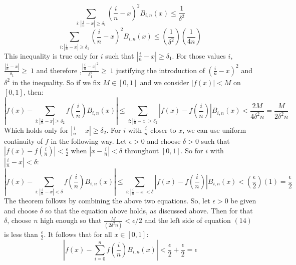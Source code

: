 \documentclass{article}
\begin{document}
\begin{equation}
\sum_{i:|\frac{i}{n}-x|\geq\delta_1}(\frac{i}{n}-x)^2B_{i,n}(x)\leq\frac{1}{\delta^2}
\end{equation}
\begin{equation}
\sum_{i:|\frac{i}{n}-x|\geq\delta_1}(\frac{i}{n}-x)^2B_{i,n}(x)\leq(\frac{1}{\delta^2})(\frac{1}{4n})
\end{equation}
This inequality is true only for $i$ such that $|\frac{i}{n}-x|\geq\delta_1$. For those values $i$, $\frac{|\frac{i}{n}-x|}{\delta_1}\geq\ 1$ and therefore ,$\frac{|\frac{i}{n}-x|^2}{\delta_1^2}\geq\ 1$ justifying the introduction of $(\frac{i}{n}-x)^2$ and $\delta^2$ in the inequality. So if we fix $M\in[0,1]$ and we consider $|f(x)|<M$ on $[0,1]$, then:
\begin{equation}
\left|f(x)-\sum_{i:|\frac{i}{n}-x|\geq\delta_2}f(\frac{i}{n})B_{i,n}(x)\right|\leq\sum_{i:|\frac{i}{n}-x|\geq\delta_2}\left|f(x)-f(\frac{i}{n})\right|B_{i,n}(x)<\frac{2M}{4\delta^2n}=\frac{M}{2\delta^2n}
\end{equation}
Which holds only for $|\frac{i}{n}-x|\geq\delta_2$. For $i$ with $\frac{i}{n}$ closer to $x$, we can use uniform continuity of $f$ in the following way. Let $\epsilon>0$  and choose $\delta>0$ such that $|f(x)-f(\frac{i}{n})|<\frac{\epsilon}{2}$ when $|x- \frac{i}{n}|<\delta$ throughout $[0,1]$. So for $i$ with $|\frac{i}{n}-x|<\delta$:
\begin{equation}
\left|f(x)-\sum_{i:|\frac{i}{n}-x|<\delta}f(\frac{i}{n})B_{i,n}(x)\right|\leq\sum_{i:|\frac{i}{n}-x|<\delta}\left|f(x)-f(\frac{i}{n})\right|B_{i,n}(x)<\left(\frac{\epsilon}{2}\right)(1)= \frac{\epsilon}{2}   
\end{equation}
The theorem follows by combining the above two equations. So, let $\epsilon>0$ be given and choose $\delta$ so that the equation above holds, as discussed above. Then for that $\delta$, choose $n$ high enough so that $\frac{M}{(2\delta^2n)}<\epsilon/2$ and the left side of equation $(14)$ is less than $\frac{\epsilon}{2}$. It follows that for all $x\in[0,1]$:
\begin{equation}
\left|f(x)-\sum_{i=0}^nf(\frac{i}{n})B_{i,n}(x)\right|<\frac{\epsilon}{2}+\frac{\epsilon}{2}=\epsilon    
\end{equation}
\end{document}
